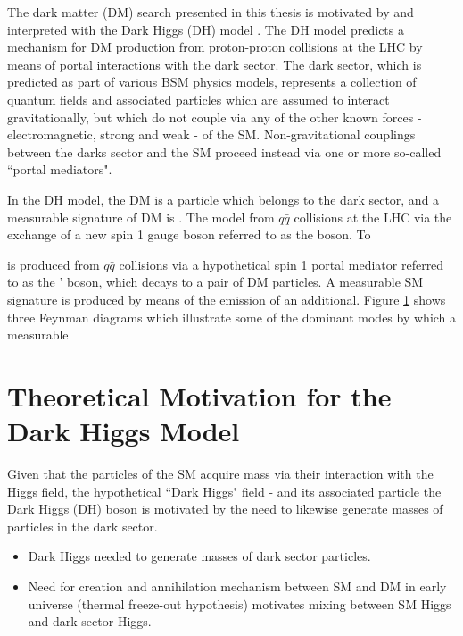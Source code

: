 \label{chapter:dh_model}

The dark matter (DM) search presented in this thesis is motivated by and interpreted with the Dark Higgs (DH) model \cite{Duerr2017}. The DH model predicts a mechanism for DM production from proton-proton collisions at the LHC by means of portal interactions with the dark sector. The dark sector, which is predicted as part of various BSM physics models, represents a collection of quantum fields and associated particles which are assumed to interact gravitationally, but which do not couple via any of the other known forces - electromagnetic, strong and weak - of the SM. Non-gravitational couplings between the darks sector and the SM proceed instead via one or more so-called ``portal mediators". 

In the DH model, the DM is a particle which belongs to the dark sector, and a measurable signature of DM is . The model  from \(q\bar{q}\) collisions at the LHC via the exchange of a new spin 1 gauge boson referred to as the \Zprime boson. To 

is produced from \(q\bar{q}\) collisions via a hypothetical spin 1 portal mediator referred to as the \Z' boson, which decays to a pair of DM particles. A measurable SM signature is produced by means of the emission of an additional. Figure \ref{} shows three Feynman diagrams which illustrate some of the dominant modes by which a measurable  

\section{Theoretical Motivation for the Dark Higgs Model}

Given that the particles of the SM acquire mass via their interaction with the Higgs field,  the hypothetical ``Dark Higgs" field - and its associated particle the Dark Higgs (DH) boson is motivated by the need to likewise generate masses of particles in the dark sector.

\begin{itemize}
\item Dark Higgs needed to generate masses of dark sector particles.
\item Need for creation and annihilation mechanism between SM and DM in early universe (thermal freeze-out hypothesis) motivates mixing between SM Higgs and dark sector Higgs.
\end{itemize}

